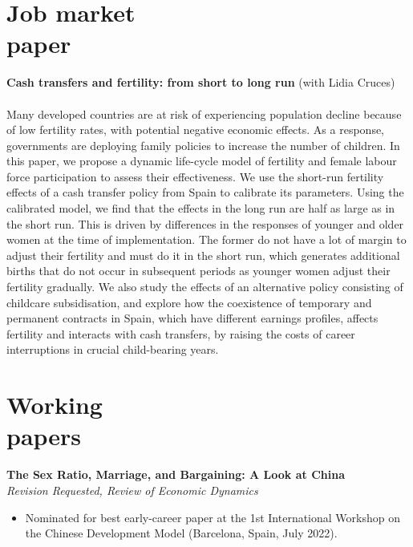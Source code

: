 \documentclass[margin]{res} %
\begin{document}
\begin{resume}
\section{Job market \\ paper}
{\bf Cash transfers and fertility: from short to long run} (with Lidia Cruces) \\
 \\
Many developed countries are at risk of experiencing population decline because of low fertility rates, with potential negative economic effects. As a response, governments are deploying family policies to increase the number of children. In this paper, we propose a dynamic life-cycle model of fertility and female labour force participation to assess their effectiveness. We use the short-run fertility effects of a cash transfer policy from Spain to calibrate its parameters. Using the calibrated model, we find that the effects in the long run are half as large as in the short run. This is driven by differences in the responses of younger and older women at the time of implementation. The former do not have a lot of margin to adjust their fertility and must do it in the short run, which generates additional births that do not occur in subsequent periods as younger women adjust their fertility gradually. We also study the effects of an alternative policy consisting of childcare subsidisation, and explore how the coexistence of temporary and permanent contracts in Spain, which have different earnings profiles, affects fertility and interacts with cash transfers, by raising the costs of career interruptions in crucial child-bearing years.

\section{Working \\ papers}
{\bf The Sex Ratio, Marriage, and Bargaining: A Look at China}  \\
\textit{Revision Requested, Review of Economic Dynamics} \\
\begin{itemize}
	\item Nominated for best early-career paper at the 1st International Workshop on the Chinese Development Model (Barcelona, Spain, July 2022). 
\end{itemize}



\end{resume}
\end{document}
